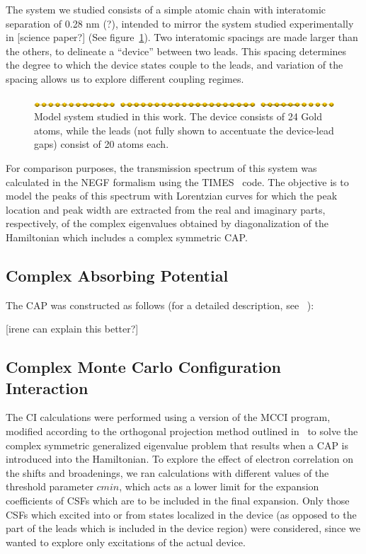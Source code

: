 The system we studied consists of a simple atomic chain with interatomic
separation of 0.28 nm (?), intended to mirror the system studied experimentally
in [science paper?] (See figure~\ref{fig:chaincapdevice}). Two interatomic
spacings are made larger than the others, to delineate a ``device'' between two
leads. This spacing determines the degree to which the device states couple to
the leads, and variation of the spacing allows us to explore different coupling
regimes.

\begin{figure}
	\begin{center}
		\includegraphics[width=0.9\linewidth]{figures/chaincapdevice}
	\end{center}
	\caption{Model system studied in this work. The device consists of 24
	Gold atoms, while the leads (not fully shown to accentuate the
	device-lead gaps) consist of 20 atoms each.}
	\label{fig:chaincapdevice}
\end{figure}

For comparison purposes, the transmission spectrum of this system was
calculated in the NEGF formalism using the TIMES~\cite{times} code. The
objective is to model the peaks of this spectrum with Lorentzian curves for
which the peak location and peak width are extracted from the real and
imaginary parts, respectively, of the complex eigenvalues obtained by
diagonalization of the Hamiltonian which includes a complex symmetric \ac{CAP}.

\subsection{Complex Absorbing Potential}
\label{subsec:CAP}

The CAP was constructed as follows (for a detailed description, see~
\cite{henderson}):

[irene can explain this better?]

\subsection{Complex Monte Carlo Configuration Interaction}

The CI calculations were performed using a version of the \ac{MCCI} program,
modified according to the orthogonal projection method outlined
in~\cite{tarantelli_csd} to solve the complex symmetric generalized eigenvalue
problem that results when a CAP is introduced into the Hamiltonian. To explore
the effect of electron correlation on the shifts and broadenings, we ran
calculations with different values of the threshold parameter $cmin$, which
acts as a lower limit for the expansion coefficients of CSFs which are to be
included in the final expansion. Only those CSFs which excited into or from
states localized in the device (as opposed to the part of the leads which is
included in the device region) were considered, since we wanted to explore
only excitations of the actual device.

